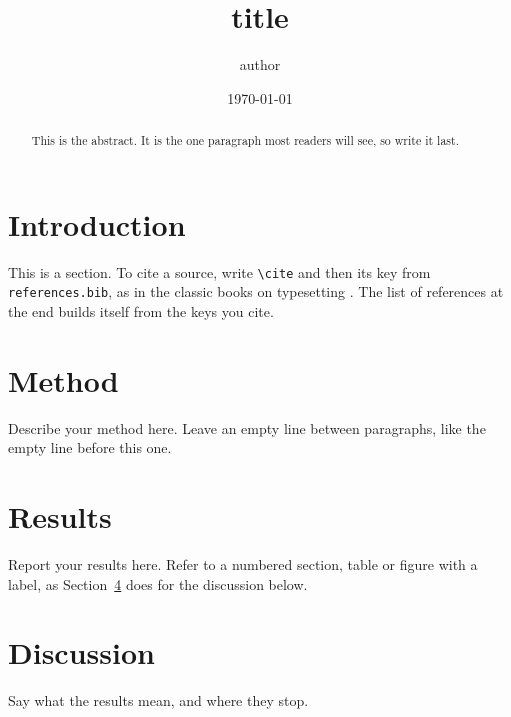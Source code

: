 \documentclass[11pt]{article}
\title{{{title}}}
\author{{{author}}}
\date{\today}
\begin{document}
\maketitle

\begin{abstract}
This is the abstract. It is the one paragraph most readers will see, so write it last.
\end{abstract}

\section{Introduction}

This is a section. To cite a source, write \verb|\cite| and then its key from
\texttt{references.bib}, as in the classic books on typesetting \cite{knuth1984,lamport1994}.
The list of references at the end builds itself from the keys you cite.

\section{Method}

Describe your method here. Leave an empty line between paragraphs, like the empty line before this one.

\section{Results}

Report your results here. Refer to a numbered section, table or figure with a label, as
Section~\ref{sec:discussion} does for the discussion below.

\section{Discussion}\label{sec:discussion}

Say what the results mean, and where they stop.



\end{document}
